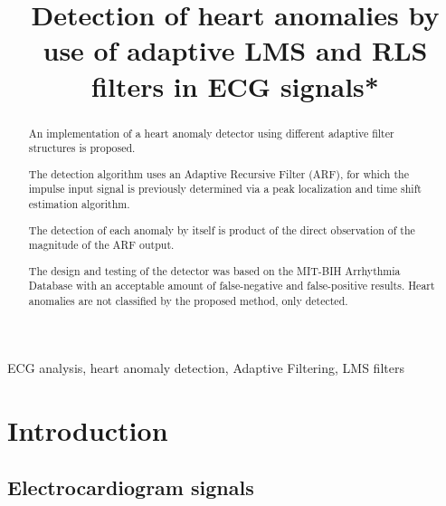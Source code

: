 \documentclass[conference]{IEEEtran}
\begin{document}
\title{Detection of heart anomalies by use of adaptive LMS and RLS filters in ECG signals*\\
}

\author{
\and
{}
}

\maketitle

\begin{abstract}
An implementation of a heart anomaly detector using different adaptive filter structures is proposed.\par
The detection algorithm uses an Adaptive Recursive Filter (ARF), for which the impulse input signal is previously determined via a peak localization and time shift estimation algorithm. \par
The detection of each anomaly by itself is product of the direct observation of the magnitude of the ARF output.\par
The design and testing of the detector was based on the MIT-BIH Arrhythmia Database with an acceptable amount of false-negative and false-positive results. Heart anomalies are not classified by the proposed method, only detected.
\end{abstract}

\begin{IEEEkeywords}
ECG analysis, heart anomaly detection, Adaptive Filtering, LMS filters
\end{IEEEkeywords}


\section{Introduction}


\subsection{Electrocardiogram signals}
\end{document}
